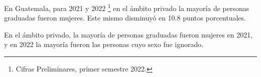 En Guatemala, para 2021 y 2022 \footnote{Cifras Preliminares, primer semestre 2022.} en el ámbito privado la mayoría de personas graduadas fueron mujeres. Este mismo disminuyó en 10.8 puntos porcentuales. 

En el ámbito privado, la mayoría de personas graduadas fueron mujeres en 2021, y en 2022 la mayoría fueron las personas cuyo sexo fue ignorado.